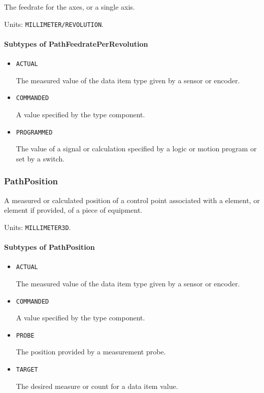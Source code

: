 The feedrate for the axes, or a single axis.


Units: \texttt{MILLIMETER/REVOLUTION}.

\paragraph{Subtypes of PathFeedratePerRevolution}\mbox{}
\label{sec:Subtypes of PathFeedratePerRevolution}

\begin{itemize}

\item \texttt{ACTUAL}


The measured value of the data item type given by a sensor or encoder.

\item \texttt{COMMANDED}


A value specified by the  type component.

\item \texttt{PROGRAMMED}


The value of a signal or calculation specified by a logic or motion program or set by a switch.


\end{itemize}

\subsubsection{PathPosition}
\label{sec:PathPosition}



A measured or calculated position of a control point associated with a  element, or  element if provided, of a piece of equipment.


Units: \texttt{MILLIMETER\textunderscore 3D}.

\paragraph{Subtypes of PathPosition}\mbox{}
\label{sec:Subtypes of PathPosition}

\begin{itemize}

\item \texttt{ACTUAL}


The measured value of the data item type given by a sensor or encoder.

\item \texttt{COMMANDED}


A value specified by the  type component.

\item \texttt{PROBE}


The position provided by a measurement probe.

\item \texttt{TARGET}


The desired measure or count for a data item value.


\end{itemize}

